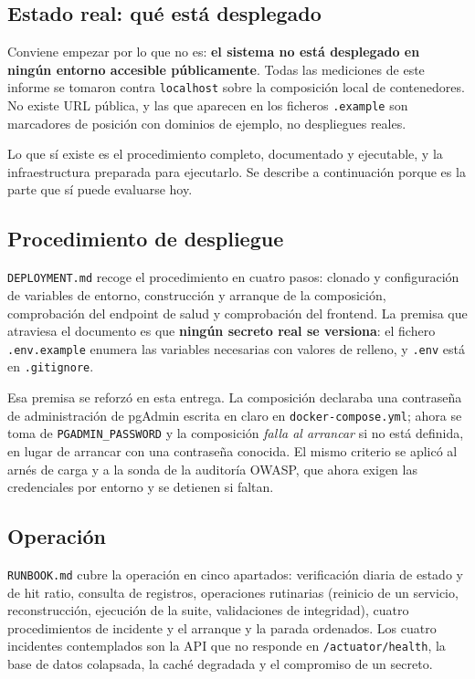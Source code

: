 \documentclass[11pt,a4paper]{article}
\begin{document}
\subsection{Estado real: qué está desplegado}

Conviene empezar por lo que no es: \textbf{el sistema no está desplegado en
ningún entorno accesible públicamente}. Todas las mediciones de este informe se
tomaron contra \texttt{localhost} sobre la composición local de contenedores. No
existe URL pública, y las que aparecen en los ficheros \texttt{.example} son
marcadores de posición con dominios de ejemplo, no despliegues reales.

Lo que sí existe es el procedimiento completo, documentado y ejecutable, y la
infraestructura preparada para ejecutarlo. Se describe a continuación porque es
la parte que sí puede evaluarse hoy.

\subsection{Procedimiento de despliegue}

\texttt{DEPLOYMENT.md} recoge el procedimiento en cuatro pasos: clonado y
configuración de variables de entorno, construcción y arranque de la
composición, comprobación del endpoint de salud y comprobación del frontend. La
premisa que atraviesa el documento es que \textbf{ningún secreto real se
versiona}: el fichero \texttt{.env.example} enumera las variables necesarias con
valores de relleno, y \texttt{.env} está en \texttt{.gitignore}.

Esa premisa se reforzó en esta entrega. La composición declaraba una contraseña
de administración de pgAdmin escrita en claro en \texttt{docker-compose.yml};
ahora se toma de \texttt{PGADMIN\_PASSWORD} y la composición \emph{falla al
arrancar} si no está definida, en lugar de arrancar con una contraseña conocida.
El mismo criterio se aplicó al arnés de carga y a la sonda de la auditoría
OWASP, que ahora exigen las credenciales por entorno y se detienen si faltan.

\subsection{Operación}

\texttt{RUNBOOK.md} cubre la operación en cinco apartados: verificación diaria
de estado y de hit ratio, consulta de registros, operaciones rutinarias
(reinicio de un servicio, reconstrucción, ejecución de la suite, validaciones de
integridad), cuatro procedimientos de incidente y el arranque y la parada
ordenados. Los cuatro incidentes contemplados son la API que no responde en
\texttt{/actuator/health}, la base de datos colapsada, la caché degradada y el
compromiso de un secreto.
\end{document}
